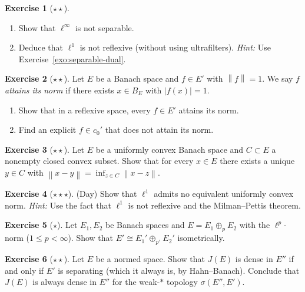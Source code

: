\documentclass[a4paper,12pt]{book}
\newcommand{\norm}[1]{\left\| #1 \right\|}
\theoremstyle{definition}
\newtheorem{exercise}{Exercise}[chapter]
\theoremstyle{plain}
\theoremstyle{remark}
\begin{document}
\begin{exercise}[$\star\star$]\label{exo:linfty-dual}
\begin{enumerate}[label=(\alph*)]
  \item Show that $\ell^\infty$ is not separable.
  \item Deduce that $\ell^1$ is not reflexive (without using ultrafilters).
  \textit{Hint:} Use Exercise~\ref{exo:separable-dual}.
\end{enumerate}
\end{exercise}

\begin{exercise}[$\star\star$]\label{exo:norm-attaining}
Let $E$ be a Banach space and $f\in E'$ with $\norm{f}=1$.  We say $f$
\emph{attains its norm} if there exists $x\in B_E$ with $|f(x)|=1$.
\begin{enumerate}[label=(\alph*)]
  \item Show that in a reflexive space, every $f\in E'$ attains its norm.
  \item Find an explicit $f\in c_0'$ that does not attain its norm.
\end{enumerate}
\end{exercise}

\begin{exercise}[$\star\star$]\label{exo:uc-unique-nearest}
Let $E$ be a uniformly convex Banach space and $C\subset E$ a nonempty closed
convex subset.  Show that for every $x\in E$ there exists a unique $y\in C$
with $\norm{x-y}=\inf_{z\in C}\norm{x-z}$.
\end{exercise}

\begin{exercise}[$\star\star\star$]\label{exo:day}
(Day) Show that $\ell^1$ admits no equivalent uniformly convex norm.
\textit{Hint:} Use the fact that $\ell^1$ is not reflexive and the
Milman--Pettis theorem.
\end{exercise}

\begin{exercise}[$\star$]\label{exo:dual-direct-sum}
Let $E_1,E_2$ be Banach spaces and $E = E_1\oplus_p E_2$ with the $\ell^p$-norm
($1\le p<\infty$).  Show that $E'\cong E_1'\oplus_{p'} E_2'$ isometrically.
\end{exercise}

\begin{exercise}[$\star\star$]\label{exo:natural-embedding-range}
Let $E$ be a normed space.  Show that $J(E)$ is dense in $E''$ if and only if
$E'$ is separating (which it always is, by Hahn--Banach).  Conclude that
$J(E)$ is always dense in $E''$ for the weak-$*$ topology $\sigma(E'',E')$.
\end{exercise}
\end{document}
